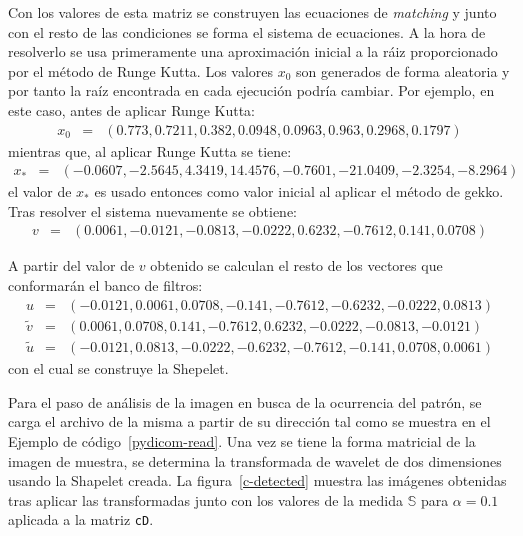 \par Con los valores de esta matriz se construyen las ecuaciones de \textit{matching} y junto con el resto de las condiciones se forma el sistema de ecuaciones. A la hora de resolverlo se usa primeramente una aproximaci\'on inicial a la r\'aiz proporcionado por el m\'etodo de Runge Kutta. Los valores $x_0$ son generados de forma aleatoria y por tanto la ra\'iz encontrada en cada ejecuci\'on podr\'ia cambiar. Por ejemplo, en este caso, antes de aplicar Runge Kutta:
\begin{eqnarray}
x_0&=&(0.773,0.7211,0.382,0.0948,0.0963,0.963,0.2968,0.1797)\nonumber
\end{eqnarray}
mientras que, al aplicar Runge Kutta se tiene:
\begin{eqnarray}
x_{\ast}&=&(-0.0607,-2.5645,4.3419,14.4576,-0.7601,-21.0409,-2.3254,-8.2964)\nonumber
\end{eqnarray}
el valor de $x_{\ast}$ es usado entonces como valor inicial al aplicar el m\'etodo de gekko. Tras resolver el sistema nuevamente se obtiene:
\begin{eqnarray}
v&=&(0.0061,-0.0121,-0.0813,-0.0222,0.6232,-0.7612,0.141,0.0708)\nonumber
\end{eqnarray}
\par A partir del valor de $v$ obtenido se calculan el resto de los vectores que conformar\'an el banco de filtros:
\begin{eqnarray}
u&=&(-0.0121,0.0061,0.0708,-0.141,-0.7612,-0.6232,-0.0222,0.0813)\nonumber\\
\tilde{v}&=&(0.0061,0.0708,0.141,-0.7612,0.6232,-0.0222,-0.0813,-0.0121)\nonumber\\
\tilde{u}&=&(-0.0121,0.0813,-0.0222,-0.6232,-0.7612,-0.141,0.0708,0.0061)\nonumber
\end{eqnarray}
con el cual se construye la Shepelet.\\

\par Para el paso de an\'alisis de la imagen en busca de la ocurrencia del patr\'on, se carga el archivo de la misma a partir de su direcci\'on tal como se muestra en el Ejemplo de c\'odigo~\ref{pydicom-read}. Una vez se tiene la forma matricial de la imagen de muestra, se determina la transformada de wavelet de dos dimensiones usando la Shapelet creada. La figura~\ref{c-detected} muestra las im\'agenes obtenidas tras aplicar las transformadas junto con los valores de la medida $\mathbb{S}$ para $\alpha=0.1$ aplicada a la matriz \texttt{cD}.

